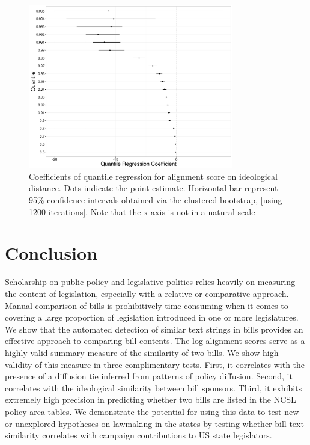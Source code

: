 \documentclass[12pt]{article} %
\begin{document}
\begin{figure}[ht!]
    \centering
    \includegraphics[width=0.8\textwidth]{figures/quantile_regression.png}
    \caption{Coefficients of quantile regression for alignment score on
    ideological distance. Dots indicate the point estimate. Horizontal bar
represent 95\% confidence intervals obtained via the clustered bootstrap, [using
1200 iterations]. Note that the x-axis is not in a natural scale}
    \label{fig:quantile_regression}
\end{figure}


\clearpage


\section{Conclusion}
Scholarship on public policy and legislative politics relies heavily on measuring the content of legislation, especially with a relative or comparative approach. Manual comparison of bills is prohibitively time consuming when it comes to covering a large proportion of legislation introduced in one or more legislatures. We show that the automated detection of similar text strings in bills provides an effective approach to comparing bill contents. The log alignment scores serve as a highly valid summary measure of the similarity of two bills. We show high validity of this measure in three complimentary tests. First, it correlates with the presence of a diffusion tie inferred from patterns of policy diffusion. Second, it correlates with the ideological similarity between bill sponsors. Third, it exhibits extremely high precision in predicting whether two bills are listed in the NCSL policy area tables. We demonstrate the potential for using this data to test new or unexplored hypotheses on lawmaking in the states by testing whether bill text similarity correlates with campaign contributions to US state legislators.
\end{document}
